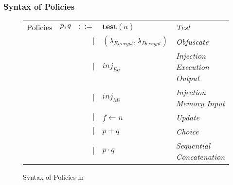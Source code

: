 \documentclass[sigconf,usenames,dvipsnames,svgnames,table]{acmart}
\begin{document}
      \subsubsection{Syntax of Policies}\label{sec:spec:synt:pol}
        \begin{figure}
          \centering
          \begin{tabular}{l c r l l}
            Policies  & $p,q$ & $::=$  & $\mathbf{test}(a)$    & \textit{Test}     \\
                      &       & $\mid$ & $(\lambda_{Encrypt}, 
                                           \lambda_{Decrypt})$ & \textit{Obfuscate} \\
                      &       & $\mid$ & $inj_{Eo}$            & \textit{Injection Execution Output} \\
                      &       & $\mid$ & $inj_{Mi}$            & \textit{Injection Memory Input} \\
                      &       & $\mid$ & $f \leftarrow n$      & \textit{Update}   \\
                      &       & $\mid$ & $p + q$               & \textit{Choice}   \\
                      &       & $\mid$ & $p \cdot q$           & \textit{Sequential Concatenation} \\
          \end{tabular}
          \caption{Syntax of Policies in \sysname}
          \label{fig:spec:synt:pol}
        \end{figure}

        
\end{document}
